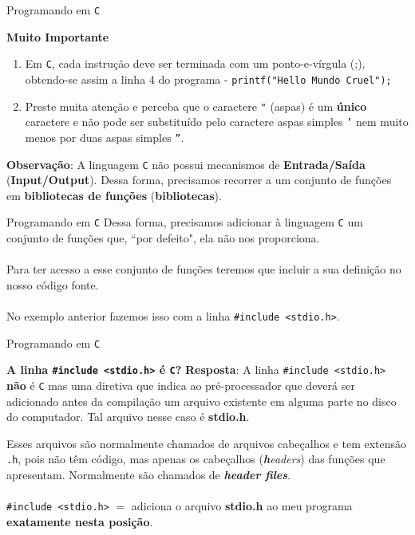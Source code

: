 \documentclass{beamer}
\newcommand{\C}{\texttt{C}}
\begin{document}
\begin{frame}{Programando em \C}
\begin{block}{\textbf{Muito Importante}}
\begin{enumerate}
	\pause \item Em \texttt{C}, cada instrução deve ser terminada com um ponto-e-vírgula (;), obtendo-se assim a linha 4 do programa - \texttt{printf("Hello Mundo Cruel");}
	\pause \item Preste muita atenção e perceba que o caractere \texttt{"} (aspas) é um \textbf{único} caractere e não pode ser substituído pelo caractere aspas simples \texttt{'} nem muito menos por duas aspas simples \texttt{''}.
\end{enumerate}
\end{block}
\pause\textbf{Observação}: A linguagem \texttt{C} não possui mecanismos de \textbf{Entrada/Saída} (\textbf{Input/Output}). Dessa forma, precisamos recorrer a um conjunto de funções em \textbf{bibliotecas de funções} (\textbf{bibliotecas}).
\end{frame}

\begin{frame}{Programando em \C}
Dessa forma, precisamos adicionar à linguagem \texttt{C} um conjunto de funções que, ``por defeito", ela não nos proporciona.\\~\\

\pause Para ter acesso a esse conjunto de funções teremos que incluir a sua definição no nosso código fonte.\\~\\

\pause No exemplo anterior fazemos isso com a linha \texttt{\#include <stdio.h>}.
\end{frame}

\begin{frame}{Programando em \C}
\pause \begin{block}{\textbf{A linha \texttt{\#include <stdio.h>} é \C?}}
\textbf{Resposta}: A linha \texttt{\#include <stdio.h>} \textbf{não} é \texttt{C} mas uma diretiva que indica ao pré-processador que deverá ser adicionado antes da compilação um arquivo existente em alguma parte no disco do computador. Tal arquivo nesse caso é \textbf{stdio.h}.
\end{block}
\vspace{0.3cm}
\pause Esses arquivos são normalmente chamados de arquivos cabeçalhos e tem extensão \texttt{.h}, pois não têm código, mas apenas os cabeçalhos (\textit{\textbf{h}eaders}) das funções que apresentam. Normalmente são chamados de \textit{\textbf{header files}}.\\~\\

\pause \texttt{\#include <stdio.h>} $=$ adiciona o arquivo \textbf{stdio.h} ao meu programa \textbf{exatamente nesta posição}.
\end{frame}
\end{document}
